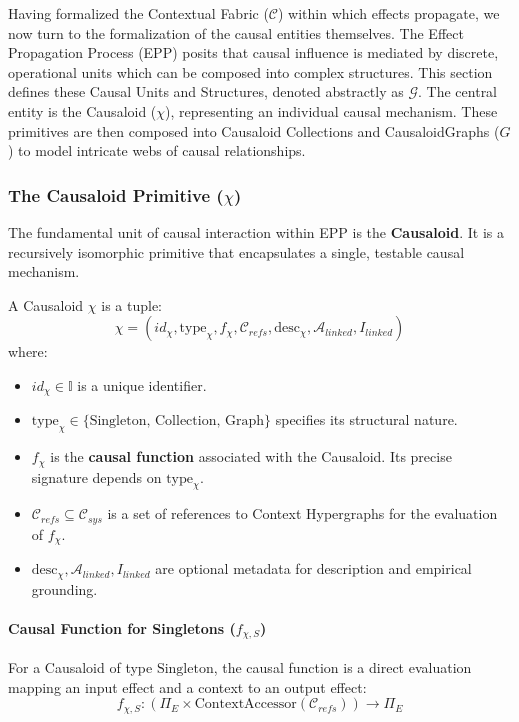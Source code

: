 Having formalized the Contextual Fabric (\(\mathcal{C}\)) within which effects propagate, we now turn to the formalization of the causal entities themselves. The Effect Propagation Process (EPP) posits that causal influence is mediated by discrete, operational units which can be composed into complex structures. This section defines these Causal Units and Structures, denoted abstractly as \(\mathcal{G}\). The central entity is the Causaloid (\(\chi\)), representing an individual causal mechanism. These primitives are then composed into Causaloid Collections and CausaloidGraphs (\(G\)) to model intricate webs of causal relationships.

\subsubsection[The Causaloid Primitive (chi)]{The Causaloid Primitive (\(\chi\))}
\label{ssec:causaloid_formal}

The fundamental unit of causal interaction within EPP is the \textbf{Causaloid}. It is a recursively isomorphic primitive that encapsulates a single, testable causal mechanism.

\begin{definition}[Causaloid]
\label{def:causaloid}
A Causaloid \( \chi \) is a tuple:
\[ \chi = (id_\chi, \text{type}_\chi, f_\chi, \mathcal{C}_{refs}, \text{desc}_\chi, \mathcal{A}_{linked}, I_{linked}) \]
where:
\begin{itemize}
    \item \( id_\chi \in \mathbb{I} \) is a unique identifier.
    \item \( \text{type}_\chi \in \{\text{Singleton, Collection, Graph}\} \) specifies its structural nature.
    \item \( f_\chi \) is the \textbf{causal function} associated with the Causaloid. Its precise signature depends on \(\text{type}_\chi\).
    \item \( \mathcal{C}_{refs} \subseteq \mathcal{C}_{sys} \) is a set of references to Context Hypergraphs for the evaluation of \(f_\chi\).
    \item \( \text{desc}_\chi, \mathcal{A}_{linked}, I_{linked} \) are optional metadata for description and empirical grounding.
\end{itemize}
\end{definition}

\paragraph{Causal Function for Singletons (\(f_{\chi,S}\))} For a Causaloid of type \(\text{Singleton}\), the causal function is a direct evaluation mapping an input effect and a context to an output effect:
\[ f_{\chi,S}: (\Pi_E \times \text{ContextAccessor}(\mathcal{C}_{refs})) \to \Pi_E \]


